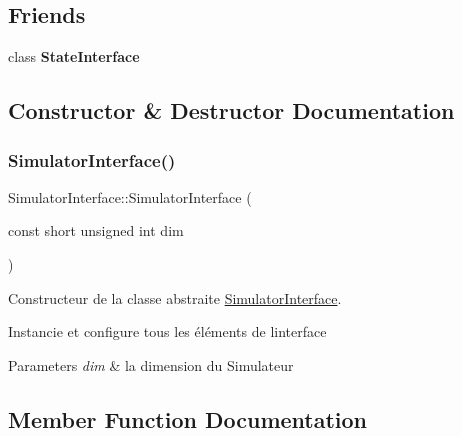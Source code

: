\subsection*{Friends}
\begin{DoxyCompactItemize}
\item 
\mbox{\label{class_simulator_interface_ae97c9f4c6315e72ebf12fe1ef851c1be}} 
class {\bfseries State\+Interface}
\end{DoxyCompactItemize}


\subsection{Constructor \& Destructor Documentation}
\mbox{\label{class_simulator_interface_a031b227cc58e20c93aa5b91f08eaab8a}} 
\subsubsection{\texorpdfstring{Simulator\+Interface()}{SimulatorInterface()}}
{\footnotesize\ttfamily Simulator\+Interface\+::\+Simulator\+Interface (\begin{DoxyParamCaption}\item[{const short unsigned int}]{dim }\end{DoxyParamCaption})}



Constructeur de la classe abstraite \mbox{\hyperlink{class_simulator_interface}{Simulator\+Interface}}. 

Instancie et configure tous les éléments de l\textquotesingle{}interface 
\begin{DoxyParams}{Parameters}
{\em dim} & la dimension du Simulateur \\
\hline
\end{DoxyParams}


\subsection{Member Function Documentation}
\mbox{\label{class_simulator_interface_a64e59139c9e67758d9c2c0f2a2029749}} 
